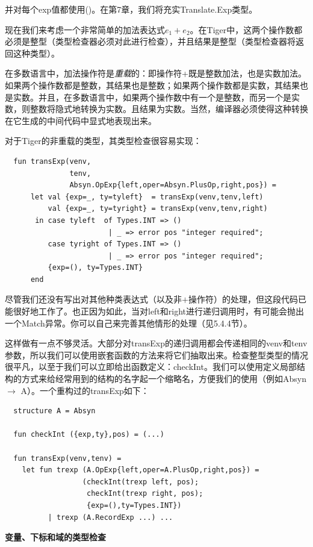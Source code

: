 \documentclass[cn,11pt,chinese]{elegantbook}
\begin{document}
并对每个exp值都使用()。在第7章，我们将充实Translate.Exp类型。

现在我们来考虑一个非常简单的加法表达式$e_1+e_2$。在Tiger中，这两个操作数都必须是整型（类型检查器必须对此进行检查），并且结果是整型（类型检查器将返回这种类型）。

在多数语言中，加法操作符是\textit{重载}的：即操作符+既是整数加法，也是实数加法。如果两个操作数都是整数，其结果也是整数；如果两个操作数都是实数，其结果也是实数。并且，在多数语言中，如果两个操作数中有一个是整数，而另一个是实数，则整数将隐式地转换为实数。且结果为实数。当然，编译器必须使得这种转换在它生成的中间代码中显式地表现出来。

对于Tiger的非重载的类型，其类型检查很容易实现：

\begin{lstlisting}
  fun transExp(venv,
               tenv,
               Absyn.OpExp{left,oper=Absyn.PlusOp,right,pos}) =
      let val {exp=_, ty=tyleft}  = transExp(venv,tenv,left)
          val {exp=_, ty=tyright} = transExp(venv,tenv,right)
       in case tyleft  of Types.INT => ()
                        | _ => error pos "integer required";
          case tyright of Types.INT => ()
                        | _ => error pos "integer required";
          {exp=(), ty=Types.INT}
      end
\end{lstlisting}

尽管我们还没有写出对其他种类表达式（以及非$+$操作符）的处理，但这段代码已能很好地工作了。也正因为如此，当对left和right进行递归调用时，有可能会抛出一个Match异常。你可以自己来完善其他情形的处理（见5.4.4节）。

这样做有一点不够灵活。大部分对transExp的递归调用都会传递相同的venv和tenv参数，所以我们可以使用嵌套函数的方法来将它们抽取出来。检查整型类型的情况很平凡，以至于我们可以立即给出函数定义：checkInt。我们可以使用定义局部结构的方式来给经常用到的结构的名字起一个缩略名，方便我们的使用（例如Absyn $\rightarrow$ A）。一个重构过的transExp如下：

\begin{lstlisting}
  structure A = Absyn

  fun checkInt ({exp,ty},pos) = (...)

  fun transExp(venv,tenv) =
    let fun trexp (A.OpExp{left,oper=A.PlusOp,right,pos}) =
                  (checkInt(trexp left, pos);
                   checkInt(trexp right, pos);
                   {exp=(),ty=Types.INT})
          | trexp (A.RecordExp ...) ...
\end{lstlisting}

\textbf{变量、下标和域的类型检查}
\end{document}
